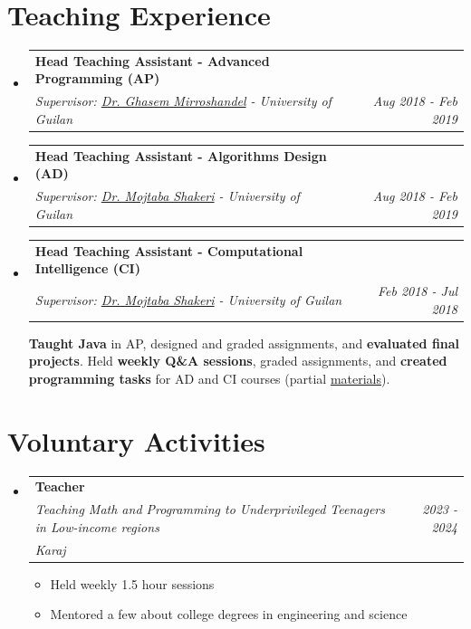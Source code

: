 \documentclass[letterpaper,11pt]{article}
\makeatletter
\newcommand{\resumeItem}[1]{
  \item\small{
    {#1 \vspace{0pt}}
  }
}
\newcommand{\resumeSubheading}[5]{
  \item
    \begin{tabular*}{0.97\textwidth}{l@{\extracolsep{\fill}}r}
      \textbf{#1} & #2 \\ 
      \textit{\small#3} & \textit{\small #4} \\
      \textit{#5} & 
    \end{tabular*}\vspace{-5pt}
}
\newcommand{\resumeSubheadingF}[4]{
  \item
    \begin{tabular*}{0.97\textwidth}{l@{\extracolsep{\fill}}r}
      \textbf{#1} & #2 \\ 
      \textit{\small#3} & \textit{\small #4} \\
    \end{tabular*}\vspace{-5pt}
}
\newcommand{\resumeSubHeadingListStart}{\begin{itemize}[leftmargin=*]}
\newcommand{\resumeSubHeadingListEnd}{\end{itemize}}
\newcommand{\resumeItemListStart}{\begin{itemize}}
\newcommand{\resumeItemListEnd}{\end{itemize}\vspace{-5pt}}
\makeatother
\begin{document}
\section{Teaching Experience}
  \resumeSubHeadingListStart
    \resumeSubheadingF
      {Head Teaching Assistant - Advanced Programming (AP)}{}
      {Supervisor: \href{https://ir.linkedin.com/in/seyed-abolghasem-mirroshandel-1a3a5950}{Dr. Ghasem Mirroshandel} - University of Guilan} 
      {Aug 2018 - Feb 2019}
  

    
    \resumeSubheadingF
      {Head Teaching Assistant - Algorithms Design (AD)}{}
      {Supervisor: \href{https://www.linkedin.com/in/mojtaba-moe-shakeri-b34a2b6/}{Dr. Mojtaba Shakeri} - University of Guilan} 
      {Aug 2018 - Feb 2019}
    
    \resumeSubheadingF
      {Head Teaching Assistant - Computational Intelligence (CI)}{}
      {Supervisor: \href{https://www.linkedin.com/in/mojtaba-moe-shakeri-b34a2b6/}{Dr. Mojtaba Shakeri} - University of Guilan}
      {Feb 2018 - Jul 2018}

    \vspace{10pt}
    \textbf{Taught Java} in AP, designed and graded assignments, and \textbf{evaluated final projects}. Held \textbf{weekly Q\&A sessions}, graded assignments, and \textbf{created programming tasks} for AD and CI courses (partial \href{https://github.com/Computational-Intelligence-Fall18/Computational-Intelligence-Tutorials}{materials}).
    
  \resumeSubHeadingListEnd

\section{Voluntary Activities}
  \resumeSubHeadingListStart
  \resumeSubheading
    {Teacher}{}
    {Teaching Math and Programming to Underprivileged Teenagers in Low-income regions} 
    {2023 - 2024}{Karaj}
    \resumeItemListStart
      \resumeItem{Held weekly 1.5 hour sessions}
      \resumeItem{Mentored a few about college degrees in engineering and science}
    \resumeItemListEnd
  \resumeSubHeadingListEnd
\end{document}

